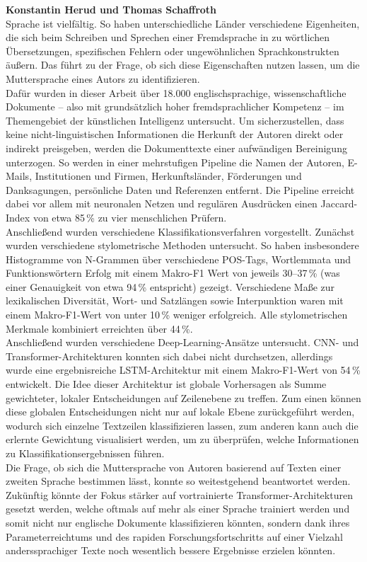 \documentclass[bachelor,german]{info1thesis}
\begin{document}
\textbf{Konstantin Herud und Thomas Schaffroth} \\
Sprache ist vielfältig. So haben unterschiedliche Länder verschiedene Eigenheiten, die sich beim Schreiben und Sprechen einer Fremdsprache in zu wörtlichen Übersetzungen, spezifischen Fehlern oder ungewöhnlichen Sprachkonstrukten äußern. Das führt zu der Frage, ob sich diese Eigenschaften nutzen lassen, um die Muttersprache eines Autors zu identifizieren. \\
Dafür wurden in dieser Arbeit über 18.000 englischsprachige, wissenschaftliche Dokumente -- also mit grundsätzlich hoher fremdsprachlicher Kompetenz -- im Themengebiet der künstlichen Intelligenz untersucht.
Um sicherzustellen, dass keine nicht-linguistischen Informationen die Herkunft der Autoren direkt oder indirekt preisgeben, werden die Dokumenttexte einer aufwändigen Bereinigung unterzogen. So werden in einer mehrstufigen Pipeline die Namen der Autoren, E-Mails, Institutionen und Firmen, Herkunftsländer, Förderungen und Danksagungen, persönliche Daten und Referenzen entfernt. Die Pipeline erreicht dabei vor allem mit neuronalen Netzen und regulären Ausdrücken einen Jaccard-Index von etwa 85\,\% zu vier menschlichen Prüfern. \\
Anschließend wurden verschiedene Klassifikationsverfahren vorgestellt. Zunächst wurden verschiedene stylometrische Methoden untersucht. So haben insbesondere Histogramme von N-Grammen über verschiedene POS-Tags, Wortlemmata und Funktionswörtern Erfolg mit einem Makro-F1 Wert von jeweils 30--37\,\% (was einer Genauigkeit von etwa 94\,\% entspricht) gezeigt. Verschiedene Maße zur lexikalischen Diversität, Wort- und Satzlängen sowie Interpunktion waren mit einem Makro-F1-Wert von unter 10\,\% weniger erfolgreich. Alle stylometrischen Merkmale kombiniert erreichten über 44\,\%. \\
Anschließend wurden verschiedene Deep-Learning-Ansätze untersucht. CNN- und Trans\-former-Architekturen konnten sich dabei nicht durchsetzen, allerdings wurde eine ergebnisreiche LSTM-Architektur mit einem Makro-F1-Wert von 54\,\% entwickelt. Die Idee dieser Architektur ist globale Vorhersagen als Summe gewichteter, lokaler Entscheidungen auf Zeilenebene zu treffen. Zum einen können diese globalen Entscheidungen nicht nur auf lokale Ebene zurückgeführt werden, wodurch sich einzelne Textzeilen klassifizieren lassen, zum anderen kann auch die erlernte Gewichtung visualisiert werden, um zu überprüfen, welche Informationen zu Klassifikationsergebnissen führen. \\
Die Frage, ob sich die Muttersprache von Autoren basierend auf Texten einer zweiten Sprache bestimmen lässt, konnte so weitestgehend beantwortet werden. \\
Zukünftig könnte der Fokus stärker auf vortrainierte Transformer-Architekturen gesetzt werden, welche oftmals auf mehr als einer Sprache trainiert werden und somit nicht nur englische Dokumente klassifizieren könnten, sondern dank ihres Parameterreichtums und des rapiden Forschungsfortschritts auf einer Vielzahl anderssprachiger Texte noch wesentlich bessere Ergebnisse erzielen könnten.
\end{document}
